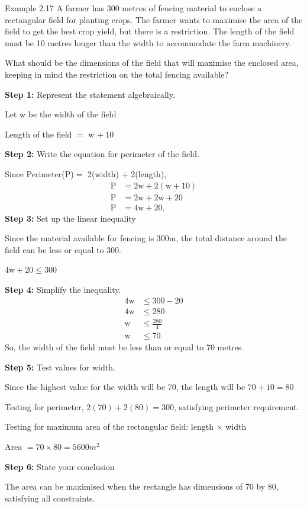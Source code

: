 \begin{example}{Example 2.17}
A farmer has 300 metres of fencing material to enclose a rectangular field for
planting crops. The farmer wants to maximise the area of the field to get the best
crop yield, but there is a restriction. The length of the field must be 10 metres
longer than the width to accommodate the farm machinery.

What should be the dimensions of the field that will maximise the enclosed area,
keeping in mind the restriction on the total fencing available?

\solution
\textbf{Step 1:} Represent the statement algebraically.

Let w be the width of the field

Length of the field $=$ w $+\ 10$

\textbf{Step 2:} Write the equation for perimeter of the field.

Since Perimeter(P)$=$ 2(width) $+$ 2(length),
\begin{align*}
  \text{P} &= 2\text{w} + 2(\text{w} + 10) \\
  \text{P} &= 2\text{w} + 2\text{w} + 20 \\
  \text{P} &= 4\text{w} + 20.
\end{align*}
\textbf{Step 3:} Set up the linear inequality

Since the material available for fencing is 300m, the total distance around the
field can be less or equal to 300.

$4\text{w} + 20 \le 300$

\textbf{Step 4:} Simplify the inequality.
\begin{align*}
  4\text{w} &\le 300 - 20 \\
  4\text{w} &\le 280 \\
  \text{w} &\le \frac{280}{4} \\
  \text{w} &\le 70
\end{align*}
So, the width of the field must be less than or equal to 70 metres.

\textbf{Step 5:} Test values for width.

Since the highest value for the width will be 70, the length will be $70 + 10 = 80$

Testing for perimeter, $2(70) + 2(80) = 300$, satisfying perimeter requirement.

Testing for maximum area of the rectangular field: length $\times$ width

Area $= 70 \times 80 = 5600m^2$

\textbf{Step 6:} State your conclusion

The area can be maximised when the rectangle has dimensions of 70 by 80,
satisfying all constraints.
\end{example}


